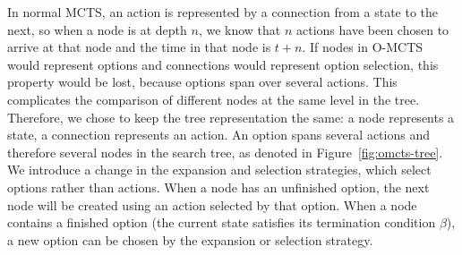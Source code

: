 In normal MCTS, an action is represented by a connection from a state to the
next, so when a node is at depth $n$, we know that $n$ actions have been chosen
to arrive at that node and the time in that node is $t+n$. If nodes in O-MCTS
would represent options and connections would represent option selection, this
property would be lost, because options span over several actions. This
complicates the comparison of different nodes at the same level in the tree.
Therefore, we chose to keep the tree representation the same: a node represents
a state, a connection represents an action. An option spans several actions and
therefore several nodes in the search tree, as denoted in Figure~\ref{fig:omcts-tree}. We introduce a change in the expansion and selection
strategies, which select options rather than actions. When a node has an
unfinished option, the next node will be created using an action selected by
that option. When a node contains a finished option (the current state satisfies
its termination condition $\beta$), a new option can be chosen by the expansion
or selection strategy.


